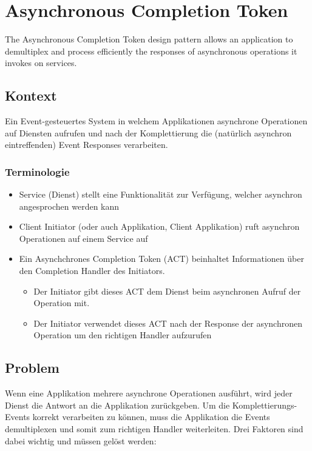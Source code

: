 \section{Asynchronous Completion Token}
\label{sec:asynchronous-completion-token}

The Asynchronous Completion Token design pattern allows an application to demultiplex and process efficiently the responses of asynchronous operations it invokes on services.

\subsection{Kontext}
Ein Event-gesteuertes System in welchem Applikationen asynchrone Operationen auf Diensten aufrufen und nach der Komplettierung die (natürlich asynchron eintreffenden) Event Responses verarbeiten.


\subsubsection*{Terminologie}

\begin{itemize}
	\item Service (Dienst) stellt eine Funktionalität zur Verfügung, welcher asynchron angesprochen werden kann
	\item Client Initiator (oder auch Applikation, Client Applikation) ruft asynchron Operationen auf einem Service auf
	\item Ein Asynchchrones Completion Token (ACT) beinhaltet Informationen über den Completion Handler des Initiators.
	\begin{itemize}
		\item Der Initiator gibt dieses ACT dem Dienst beim asynchronen Aufruf der Operation mit.
		\item Der Initiator verwendet dieses ACT nach der Response der asynchronen Operation um den richtigen Handler aufzurufen
	\end{itemize}
\end{itemize}


\subsection{Problem}

Wenn eine Applikation mehrere asynchrone Operationen ausführt, wird jeder Dienst die Antwort an die Applikation zurückgeben. Um die Komplettierungs-Events korrekt verarbeiten zu können, muss die Applikation die Events demultiplexen und somit zum richtigen Handler weiterleiten.
Drei Faktoren sind dabei wichtig und müssen gelöst werden:

